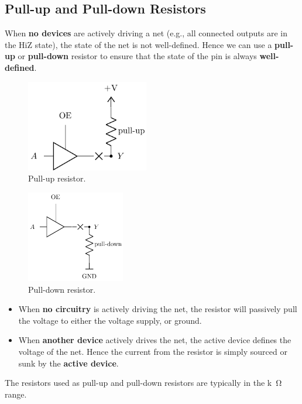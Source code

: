 \documentclass{report}
\begin{document}
\subsection{Pull-up and Pull-down Resistors}
When \textbf{no devices} are actively driving a net (e.g., all connected outputs are in the HiZ state),
the state of the net is not well-defined. Hence we can use a \textbf{pull-up} or \textbf{pull-down} resistor
to ensure that the state of the pin is always \textbf{well-defined}.
\pagebreak
\begin{multicols}{2}
    \begin{figure}[H]
        \centering
        \includegraphics[height = 4cm, keepaspectratio = true]{figures/pullup_resistor.pdf}
        \caption{Pull-up resistor.} %
    \end{figure}
    \begin{figure}[H]
        \centering
        \includegraphics[height = 4cm, keepaspectratio = true]{figures/pulldown_resistor.pdf}
        \caption{Pull-down resistor.} %
    \end{figure}
\end{multicols}
\begin{itemize}
    \item When \textbf{no circuitry} is actively driving the net, the resistor will passively pull the voltage to either the voltage supply, or ground.
    \item When \textbf{another device} actively drives the net, the active device defines the voltage of the net. Hence the current from the resistor is simply sourced
          or sunk by the \textbf{active device}.
\end{itemize}
The resistors used as pull-up and pull-down resistors are typically in the \unit{k\ohm} range.
\end{document}
